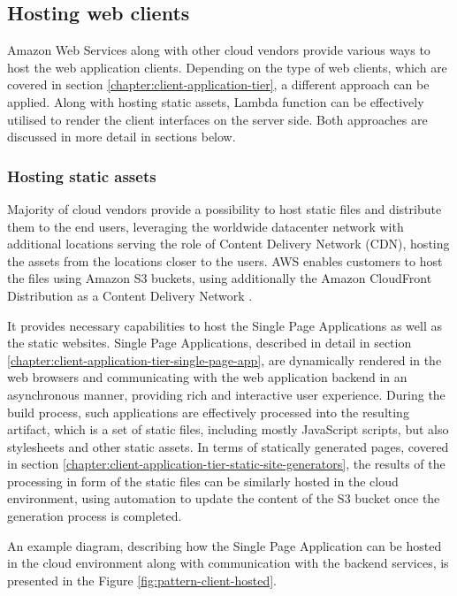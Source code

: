 \subsection{Hosting web clients}

Amazon Web Services along with other cloud vendors provide various ways to host the web application clients.
Depending on the type of web clients, which are covered in section \ref{chapter:client-application-tier}, a different approach can be applied.
Along with hosting static assets, Lambda function can be effectively utilised to render the client interfaces on the server side.
Both approaches are discussed in more detail in sections below.

\subsubsection{Hosting static assets}

Majority of cloud vendors provide a possibility to host static files and distribute them to the end users, leveraging the worldwide datacenter network with additional locations serving the role of Content Delivery Network (CDN), hosting the assets from the locations closer to the users.
AWS enables customers to host the files using Amazon S3 buckets, using additionally the Amazon CloudFront Distribution as a Content Delivery Network  \cite{AWSWebHosting}.

It provides necessary capabilities to host the Single Page Applications as well as the static websites.
Single Page Applications, described in detail in section \ref{chapter:client-application-tier-single-page-app}, are dynamically rendered in the web browsers and communicating with the web application backend in an asynchronous manner, providing rich and interactive user experience.
During the build process, such applications are effectively processed into the resulting artifact, which is a set of static files, including mostly JavaScript scripts, but also stylesheets and other static assets.
In terms of statically generated pages, covered in section \ref{chapter:client-application-tier-static-site-generators}, the results of the processing in form of the static files can be similarly hosted in the cloud environment, using automation to update the content of the S3 bucket once the generation process is completed.

An example diagram, describing how the Single Page Application can be hosted in the cloud environment along with communication with the backend services, is presented in the Figure \ref{fig:pattern-client-hosted}.

